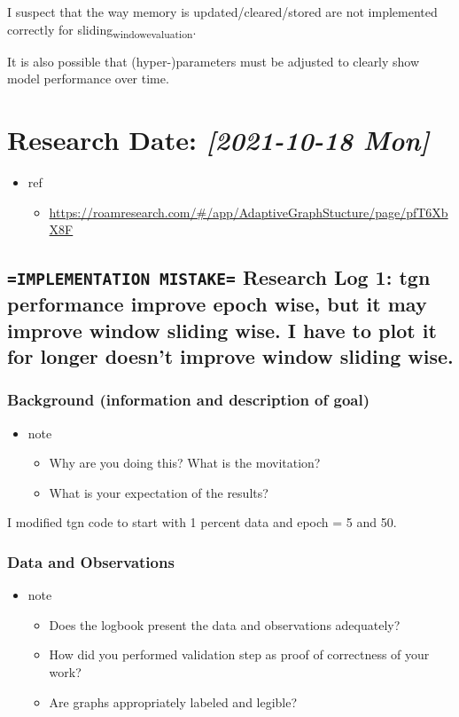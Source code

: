\documentclass[11pt]{article}
\begin{document}
I suspect that the way memory is updated/cleared/stored are not implemented correctly for sliding\textsubscript{window}\textsubscript{evaluation}.

It is also possible that (hyper-)parameters must be adjusted to clearly show model performance over time.

\section{Research Date: \textit{[2021-10-18 Mon]}}
\label{sec:orgc22eee0}
\begin{itemize}
\item ref
\begin{itemize}
\item \url{https://roamresearch.com/\#/app/AdaptiveGraphStucture/page/pfT6XbX8F}
\end{itemize}
\end{itemize}
\subsection{\texttt{=IMPLEMENTATION MISTAKE=} Research Log 1: tgn performance improve epoch wise, but it may improve window sliding wise. I have to plot it for longer doesn't improve window sliding wise.}
\label{sec:org197d189}
\subsubsection{Background (information and description of goal)}
\label{sec:orgf529bda}
\begin{itemize}
\item note
\begin{itemize}
\item Why are you doing this? What is the movitation?
\item What is your expectation of the results?
\end{itemize}
\end{itemize}

I modified tgn code to start with 1 percent data and epoch = 5 and 50.

\subsubsection{Data and Observations}
\label{sec:org480463b}
\begin{itemize}
\item note
\begin{itemize}
\item Does the logbook present the data and observations adequately?
\item How did you performed validation step as proof of correctness of your work?
\item Are graphs appropriately labeled and legible?
\end{itemize}
\end{itemize}
\end{document}

